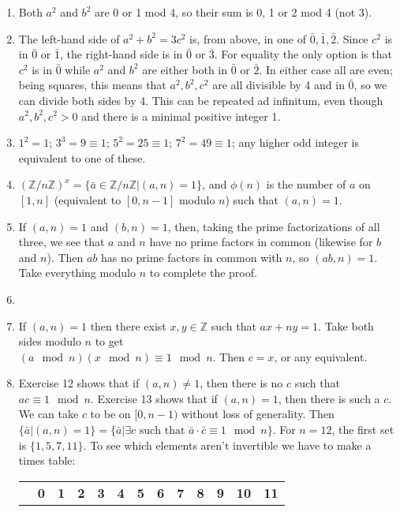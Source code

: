 \documentclass[]{article}
\newcommand{\bbz}{\mathbb{Z}}
\begin{document}
\begin{enumerate}
\item Both $a^2$ and $b^2$ are 0 or 1 mod 4, so their sum is 0, 1 or 2 mod 4 (not 3).
\item The left-hand side of $a^2 + b^2 = 3c^2$ is, from above, in one of $\bar{0}, \bar{1}, \bar{2}$. Since $c^2$ is in $\bar{0}$ or $\bar{1}$, the right-hand side is in $\bar{0}$ or $\bar{3}$. For equality the only option is that $c^2$ is in $\bar{0}$ while $a^2$ and $b^2$ are either both in $\bar{0}$ or $\bar{2}$. In either case all are even; being squares, this means that $a^2, b^2, c^2$ are all divisible by 4 and in $\bar{0}$, so we can divide both sides by 4. This can be repeated ad infinitum, even though $a^2, b^2, c^2 > 0$ and there is a minimal positive integer 1.
\item $1^2 = 1$; $3^3 = 9 \equiv 1$; $5^2 = 25 \equiv 1$; $7^2 = 49 \equiv 1$; any higher odd integer is equivalent to one of these.
\item $(\bbz / n \bbz)^x = \{ \bar{a} \in \bbz / n\bbz \vert (a,n) = 1 \}$, and $\phi(n)$ is the number of $a$ on $[1,n]$ (equivalent to $[0,n-1]$ modulo $n$) such that $(a,n) = 1$.
\item If $(a,n) = 1$ and $(b,n) = 1$, then, taking the prime factorizations of all three, we see that $a$ and $n$ have no prime factors in common (likewise for $b$ and $n$). Then $ab$ has no prime factors in common with $n$, so $(ab,n) = 1$. Take everything modulo $n$ to complete the proof.
\item 
\item If $(a,n) = 1$ then there exist $x,y\in\bbz$ such that $ax+ny=1$. Take both sides modulo $n$ to get \\ $(a\mod n)(x\mod n) \equiv 1\mod n$. Then $c = x$, or any equivalent.
\item Exercise 12 shows that if $(a,n) \neq 1$, then there is no $c$ such that $ac \equiv 1\mod n$. Exercise 13 shows that if $(a,n) = 1$, then there is such a $c$. We can take $c$ to be on $[0,n-1)$ without loss of generality. Then $\{ \bar{a} \vert (a,n) = 1 \} = \{ \bar{a} \vert \exists c\text{ such that }\bar{a}\cdot\bar{c} \equiv 1\mod n \}$. For $n=12$, the first set is $\{ 1,5,7,11 \}$. To see which elements aren't invertible we have to make a times table: 
\begin{center}
\begin{tabular}{c||c|c|c|c|c|c|c|c|c|c|c|c|}
& \textbf{0} & \textbf{1} & \textbf{2} & \textbf{3} & \textbf{4} & \textbf{5} & \textbf{6} & \textbf{7} & \textbf{8} & \textbf{9} & \textbf{10} & \textbf{11} \\

\end{tabular}
\end{center}
\end{enumerate}
\end{document}
